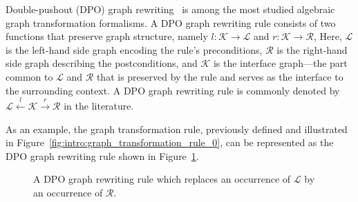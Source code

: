  Double-pushout (DPO) graph rewriting~\cite{corradini1997algebraic,habel2001double} is among the most studied algebraic graph transformation formalisms.
  A DPO graph rewriting rule consists of two functions that preserve graph structure, namely $l:\mathcal{K} \mathop{\to} \mathcal{L}$ and $r:\mathcal{K} \mathop{\to} \mathcal{R}$,
 Here, \(\mathcal{L}\) is the left-hand side graph encoding the rule's preconditions, \(\mathcal{R}\) is the right-hand side graph describing the postconditions, and \(\mathcal{K}\) is the interface graph—the part common to \(\mathcal{L}\) and \(\mathcal{R}\) that is preserved by the rule and serves as the interface to the surrounding context. A DPO graph rewriting rule is commonly denoted by \(\mathcal{L} \xleftarrow{l} \mathcal{K} \xrightarrow{r} \mathcal{R}\) in the literature.
 
 As an example, the graph transformation rule, previously defined and illustrated in Figure~\ref{fig:intro:graph_transformation_rule_0}, can be represented as the DPO graph rewriting rule shown in Figure~\ref{fig:intro:graph_transformation_rule_0_dpo}.

 \begin{figure}[H]
    \centering
    \caption{A DPO graph rewriting rule which replaces an occurrence of \(\mathcal{L}\) by an occurrence of \(\mathcal{R}\).
    }
    \label{fig:intro:graph_transformation_rule_0_dpo}
    \end{figure} 

